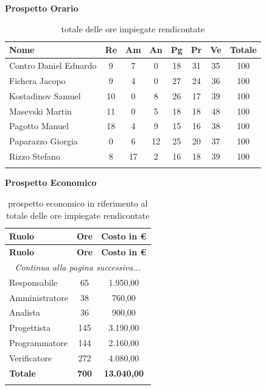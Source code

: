 \documentclass[../piano_di_progetto.tex]{subfiles}
\begin{document}
\textbf{Prospetto Orario}

\begin{center}
	\begin{longtable}{|l|c|c|c|c|c|c|c|}
		\hline
		\rowcolor{lightgray}
		\textbf{Nome} & \textbf{Re} & \textbf{Am} & \textbf{An} & \textbf{Pg}  & \textbf{Pr}   & \textbf{Ve} & \textbf{Totale} \\

		\hline
			Contro Daniel Eduardo & 9 & 7 & 0 & 18 & 31 & 35 & 100 \\
			Fichera Jacopo & 9 & 4 & 0 & 27 & 24 & 36 & 100 \\
			Kostadinov Samuel & 10 & 0 & 8 & 26 & 17 & 39 & 100 \\		
			Masevski Martin & 11 & 0 & 5 & 18 & 18 & 48 & 100 \\
			Pagotto Manuel & 18 & 4 & 9 & 15 & 16 & 38 & 100 \\			
			Paparazzo Giorgia & 0 & 6 & 12 & 25 & 20 & 37 & 100 \\
			Rizzo Stefano & 8 & 17 & 2 & 16 & 18 & 39 & 100 \\
		\hline	
		\rowcolor{white}
		\caption{totale delle ore impiegate rendicontate}
	\end{longtable}
\end{center}

\textbf{Prospetto Economico}

\begin{center}
	\begin{longtable}{|l|c|c|}
		\hline
		\rowcolor{lightgray}
		\textbf{Ruolo} & \textbf{Ore} & \textbf{Costo in €}\\

		\hline

		\endfirsthead
	
	\hline
	\rowcolor{lightgray}
	\textbf{Ruolo} & \textbf{Ore} & \textbf{Costo in €}\\
	\hline
	\endhead
	
	\hline
	\multicolumn{3}{|c|}{\emph{Continua alla pagina successiva...}}\\
	\hline
	\endfoot

	\endlastfoot
		Responsabile & 65 & 1.950,00 \\
		Amministratore & 38 & 760,00 \\
		Analista & 36 & 900,00 \\
		Progettista & 145 & 3.190,00 \\
		Programmatore & 144 & 2.160,00 \\
		Verificatore & 272 & 4.080,00 \\
		\textbf{Totale} & \textbf{700} & \textbf{13.040,00}\\
		\hline
		\caption{prospetto economico in riferimento al totale delle ore impiegate rendicontate}
	\end{longtable}
\end{center}
\end{document}
